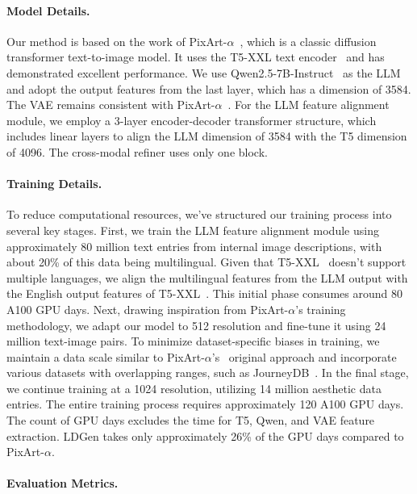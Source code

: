 \paragraph{Model Details.}

Our method is based on the work of PixArt-$\alpha$~\cite{chen2023pixart}, which is a classic diffusion transformer text-to-image model. It uses the T5-XXL text encoder~\cite{raffel2020exploring} and has demonstrated excellent performance. We use Qwen2.5-7B-Instruct~\cite{yang2024qwen2} as the LLM and adopt the output features from the last layer, which has a dimension of 3584. The VAE remains consistent with PixArt-$\alpha$~\cite{chen2023pixart}. For the LLM feature alignment module, we employ a 3-layer encoder-decoder transformer structure, which includes linear layers to align the LLM dimension of 3584 with the T5 dimension of 4096. The cross-modal refiner uses only one block.
\paragraph{Training Details.}

To reduce computational resources, we've structured our training process into several key stages. First, we train the LLM feature alignment module using approximately 80 million text entries from internal image descriptions, with about 20\% of this data being multilingual. Given that T5-XXL~\cite{raffel2020exploring} doesn't support multiple languages, we align the multilingual features from the LLM output with the English output features of T5-XXL~\cite{raffel2020exploring}. This initial phase consumes around 80 A100 GPU days. Next, drawing inspiration from PixArt-$\alpha$'s training methodology, we adapt our model to 512 resolution and fine-tune it using 24 million text-image pairs. To minimize dataset-specific biases in training, we maintain a data scale similar to PixArt-$\alpha$'s~\cite{chen2023pixart} original approach and incorporate various datasets with overlapping ranges, such as JourneyDB~\cite{sun2023journeydb}. In the final stage, we continue training at a 1024 resolution, utilizing 14 million aesthetic data entries. The entire training process requires approximately 120 A100 GPU days. The count of GPU days excludes the time for T5, Qwen, and VAE feature extraction. LDGen takes only approximately 26\% of the GPU days compared to PixArt-$\alpha$.





\paragraph{Evaluation Metrics.}


